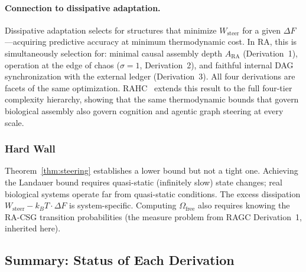 \documentclass[11pt,a4paper]{article}
\theoremstyle{plain}
\theoremstyle{definition}
\theoremstyle{remark}
\newcommand{\ARA}{A_{\mathrm{RA}}}
\begin{document}
\paragraph{Connection to dissipative adaptation.} Dissipative adaptation
\citep{England2013} selects for structures that minimize $W_{\mathrm{steer}}$ for
a given $\Delta F$---acquiring predictive accuracy at minimum thermodynamic cost.
In RA, this is simultaneously selection for: minimal causal assembly depth $\ARA$
(Derivation~1), operation at the edge of chaos ($\sigma = 1$, Derivation~2), and faithful
internal DAG synchronization with the external ledger (Derivation~3). All four derivations
are facets of the same optimization. RAHC~\citep{Sandeman2026RAHC} extends this
result to the full four-tier complexity hierarchy, showing that the same
thermodynamic bounds that govern biological assembly also govern cognition and
agentic graph steering at every scale.

\subsubsection{Hard Wall}

Theorem~\ref{thm:steering} establishes a lower bound but not a tight one. Achieving
the Landauer bound requires quasi-static (infinitely slow) state changes; real
biological systems operate far from quasi-static conditions. The excess dissipation
$W_{\mathrm{steer}} - k_{B}T \cdot \Delta F$ is system-specific. Computing
$\Omega_{\mathrm{free}}$ also requires knowing the RA-CSG transition probabilities
(the measure problem from RAGC Derivation~1, inherited here).

\subsection{Summary: Status of Each Derivation}
\end{document}

